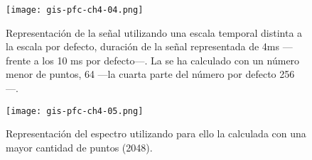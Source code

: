 \begin{figure}\ContinuedFloat
    \begin{center}
	\texttt{[image: gis-pfc-ch4-04.png]}
    \end{center}
    \caption[]{Representación de la señal utilizando una escala temporal
    distinta a la escala por defecto, duración de la señal representada de
    4ms ---frente a los 10 ms por defecto---. La  se ha calculado
    con un número menor de puntos, 64 ---la cuarta parte del número por
    defecto 256---.}
    \label{fig:test4}
\end{figure}

\begin{figure}\ContinuedFloat
    \begin{center}
	\texttt{[image: gis-pfc-ch4-05.png]}
    \end{center}
    \caption[]{Representación del espectro utilizando para ello la
     calculada con una mayor cantidad de puntos (2048).}
    \label{fig:test5}
\end{figure}
